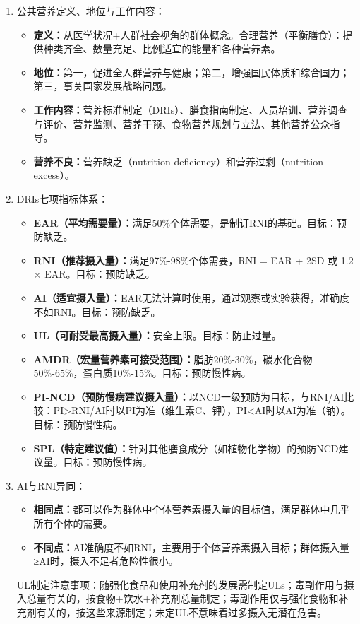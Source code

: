 {\begin{enumerate}[leftmargin=*, itemsep=5pt]
    \item 公共营养定义、地位与工作内容：
    \begin{itemize}
        \item \textbf{定义：}从医学状况+人群社会视角的群体概念。合理营养（平衡膳食）：提供种类齐全、数量充足、比例适宜的能量和各种营养素。
        \item \textbf{地位：}第一，促进全人群营养与健康；第二，增强国民体质和综合国力；第三，事关国家发展战略问题。
        \item \textbf{工作内容：}营养标准制定（DRIs）、膳食指南制定、人员培训、营养调查与评价、营养监测、营养干预、食物营养规划与立法、其他营养公众指导。
        \item \textbf{营养不良：}营养缺乏（nutrition deficiency）和营养过剩（nutrition excess）。
    \end{itemize}

    \item DRIs七项指标体系：
    \begin{itemize}
        \item \textbf{EAR（平均需要量）：}满足50\%个体需要，是制订RNI的基础。目标：预防缺乏。
        \item \textbf{RNI（推荐摄入量）：}满足97\%-98\%个体需要，RNI = EAR + 2SD 或 1.2 × EAR。目标：预防缺乏。
        \item \textbf{AI（适宜摄入量）：}EAR无法计算时使用，通过观察或实验获得，准确度不如RNI。目标：预防缺乏。
        \item \textbf{UL（可耐受最高摄入量）：}安全上限。目标：防止过量。
        \item \textbf{AMDR（宏量营养素可接受范围）：}脂肪20\%-30\%，碳水化合物50\%-65\%，蛋白质10\%-15\%。目标：预防慢性病。
        \item \textbf{PI-NCD（预防慢病建议摄入量）：}以NCD一级预防为目标，与RNI/AI比较：PI>RNI/AI时以PI为准（维生素C、钾），PI<AI时以AI为准（钠）。目标：预防慢性病。
        \item \textbf{SPL（特定建议值）：}针对其他膳食成分（如植物化学物）的预防NCD建议量。目标：预防慢性病。
    \end{itemize}

    \item AI与RNI异同：
    \begin{itemize}
        \item \textbf{相同点：}都可以作为群体中个体营养素摄入量的目标值，满足群体中几乎所有个体的需要。
        \item \textbf{不同点：}AI准确度不如RNI，主要用于个体营养素摄入目标；群体摄入量≥AI时，摄入不足者危险性很小。
    \end{itemize}
    UL制定注意事项：随强化食品和使用补充剂的发展需制定ULs；毒副作用与摄入总量有关的，按食物+饮水+补充剂总量制定；毒副作用仅与强化食物和补充剂有关的，按这些来源制定；未定UL不意味着过多摄入无潜在危害。


\end{enumerate}}
